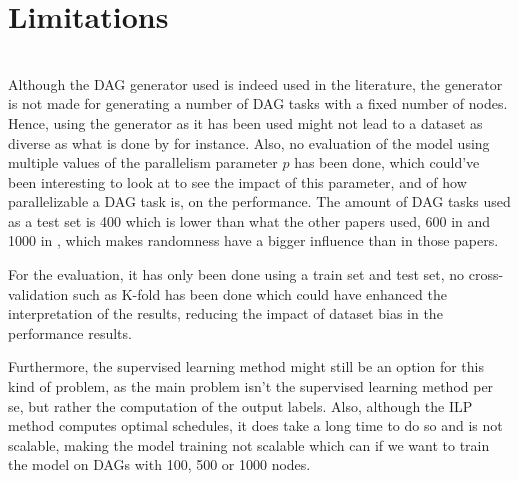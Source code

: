 \section{Limitations}
~
\\


Although the DAG generator used is indeed used in the literature\cite{Lee2021GlobalDagSchedDRL}\cite{zhao2020DAGsched}\cite{Zhao2022DAGsched},
the generator is not made for generating a number of DAG tasks
with a fixed number of nodes. Hence, 
using the generator as it has been used might not
lead to a dataset as diverse as what is done by \citet{Zhao2024GATDRLmodel} for instance.
Also, no evaluation of the model using multiple values of the parallelism
parameter $p$ has been done, which could've been interesting 
to look at to see the impact of this parameter, and of how parallelizable 
a DAG task is, on the performance.
The amount of DAG tasks used as a test set is 400 which 
is lower than what the other papers used, 600 in \citet{Zhao2024GATDRLmodel}
and 1000 in \citet{Lee2021GlobalDagSchedDRL}, which makes randomness
have a bigger influence than in those papers.

For the evaluation, 
it has only been done using a train set and test set,
no cross-validation such as K-fold has been done which could have
enhanced the interpretation of the results, reducing the impact
of dataset bias in the performance results.

Furthermore, 
the supervised learning method might still be an option
for this kind of problem, as the main problem isn't the supervised
learning method per se, but rather the computation of the output labels. 
Also, although the ILP method computes
optimal schedules, it does take a long time to do so and is not scalable,
making the model training not scalable which can if we want to train the model
on DAGs with 100, 500 or 1000 nodes.
